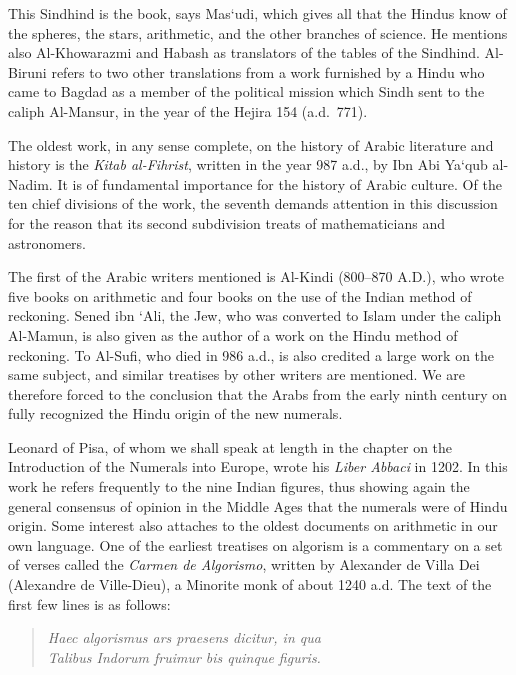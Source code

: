 \documentclass[11pt,a4paper]{article}
\begin{document}
This Sindhind is the book, says Mas`udi, which gives all that the Hindus know of the spheres, the stars, arithmetic, and the other branches of science. He mentions also Al-Khowarazmi and Habash as translators of the tables of the Sindhind. Al-Biruni refers to two other translations from a work furnished by a Hindu who came to Bagdad as a member of the political mission which Sindh sent to the caliph Al-Mansur, in the year of the Hejira 154 (a.d.~771).

The oldest work, in any sense complete, on the history of Arabic literature and history is the \textit{Kitab al-Fihrist}, written in the year 987 a.d., by Ibn Abi Ya`qub al-Nadim. It is of fundamental importance for the history of Arabic culture. Of the ten chief divisions of the work, the seventh demands attention in this discussion for the reason that its second subdivision treats of mathematicians and astronomers.

The first of the Arabic writers mentioned is Al-Kindi (800--870 A.D.), who wrote five books on arithmetic and four books on the use of the Indian method of reckoning. Sened ibn `Ali, the Jew, who was converted to Islam under the caliph Al-Mamun, is also given as the author of a work on the Hindu method of reckoning. To Al-Sufi, who died in 986 a.d., is also credited a large work on the same subject, and similar treatises by other writers are mentioned. We are therefore forced to the conclusion that the Arabs from the early ninth century on fully recognized the Hindu origin of the new numerals.

Leonard of Pisa, of whom we shall speak at length in the chapter on the Introduction of the Numerals into Europe, wrote his \textit{Liber Abbaci} in 1202. In this work he refers frequently to the nine Indian figures, thus showing again the general consensus of opinion in the Middle Ages that the numerals were of Hindu origin. Some interest also attaches to the oldest documents on arithmetic in our own language. One of the earliest treatises on algorism is a commentary on a set of verses called the \textit{Carmen de Algorismo}, written by Alexander de Villa Dei (Alexandre de Ville-Dieu), a Minorite monk of about 1240 a.d. The text of the first few lines is as follows:

\begin{quote}
\textit{Haec algorismus ars praesens dicitur, in qua}\\
\textit{Talibus Indorum fruimur bis quinque figuris.}
\end{quote}
\end{document}
